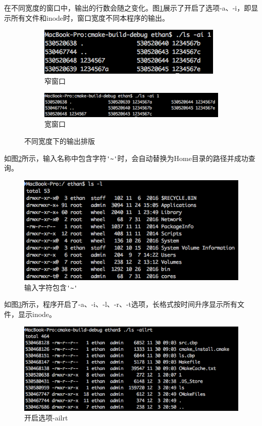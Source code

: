 \documentclass[UTF8,zihao=5,AutoFakeBold]{ctexart}
\begin{document}
在不同宽度的窗口中，输出的行数会随之变化。图\ref{fig:myls_width}展示了开启了选项-a、-i，即显示所有文件和inode时，窗口宽度不同本程序的输出。
\begin{figure}[h!]
    \centering
    \begin{subfigure}[b]{0.35\linewidth}
        \includegraphics[width=\linewidth]{myls-ai_1_1}
        \caption{窄窗口}
      \end{subfigure}
      \begin{subfigure}[b]{0.55\linewidth}
        \includegraphics[width=\linewidth]{myls-ai_1_2}
        \caption{宽窗口}
      \end{subfigure}
    \caption{不同宽度下的输出排版}
    \label{fig:myls_width}
\end{figure}

如图\ref{fig:myls_home}所示，输入名称中包含字符\lstinline{'~'}时，会自动替换为Home目录的路径并成功查询。
\begin{figure}[h!]
    \centering
    \includegraphics[width=0.7\linewidth]{origin_ls_long_format}
    \caption{输入字符包含\lstinline{'~'}}
    \label{fig:myls_home}
\end{figure}
\newpage

如图\ref{fig:myls_ailrt}所示，程序开启了-a、-i、-l、-r、-t选项，长格式按时间升序显示所有文件，显示inode。
\begin{figure}[h!]
    \centering
    \includegraphics[width=0.7\linewidth]{myls-ailrt}
    \caption{开启选项-ailrt}
    \label{fig:myls_ailrt}
\end{figure}
\end{document}
